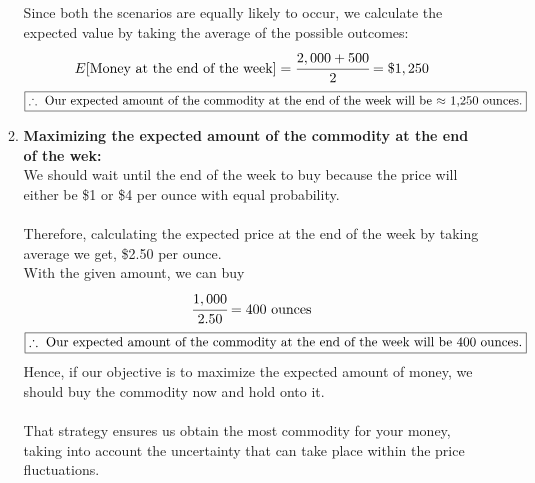 \documentclass{article}
\begin{document}
\begin{enumerate}
\begin{enumerate}
\begin{enumerate}
    \end{enumerate}
    Since both the scenarios are equally likely to occur, we calculate the expected value by taking the average of the possible outcomes:
    \[
        E [\text{Money at the end of the week}] = \cfrac{2,000 + 500}{2} = \$1,250
    \]
    \[
        \boxed{\therefore\ \textnormal{Our expected amount of the commodity at the end of the week will be \(\approx\) 1,250 ounces.}}
    \]
    \item \textbf{Maximizing the expected amount of the commodity at the end of the wek:}\\
    We should wait until the end of the week to buy because the price will either be \$1 or \$4 per ounce with equal probability.\\\\
    Therefore, calculating the expected price at the end of the week by taking average we get, \$2.50 per ounce.\\    
    With the given amount, we can buy
    \[
    \cfrac{1,000}{2.50} = 400 \text{ ounces}
    \]
    \[
        \boxed{\therefore\ \textnormal{Our expected amount of the commodity at the end of the week will be 400 ounces.}}
    \]
    Hence, if our objective is to maximize the expected amount of money, we should buy the commodity now and hold onto it.\\\\
    That strategy ensures us obtain the most commodity for your money, taking into account the uncertainty that can take place within the price fluctuations.\\
    \end{enumerate}


\end{enumerate}
\end{document}
